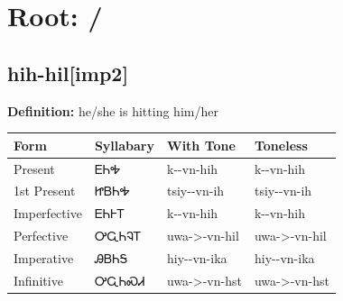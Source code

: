 \documentclass{article}%
\begin{document}
%
\normalsize%
\section*{Root:  / }%
\subsection*{hih-hil[imp2]}%
\textbf{Definition: }%
he/she is hitting him/her%
\\[0.5em]%
\begin{tabular}{|l|l|l|l|}%
\hline%
\textbf{Form}&\textbf{Syllabary}&\textbf{With Tone}&\textbf{Toneless}\\%
\hline%
Present&ᎬᏂᎭ&k{-}{-}vn{-}hih&k{-}{-}vn{-}hih\\%
1st Present&ᏥᏴᏂᎭ&tsiy{-}{-}vn{-}ih&tsiy{-}{-}vn{-}ih\\%
Imperfective&ᎬᏂᎰᎢ&k{-}{-}vn{-}hih&k{-}{-}vn{-}hih\\%
Perfective&ᎤᏩᏂᎸᎢ&uwa{-}>{-}vn{-}hil&uwa{-}>{-}vn{-}hil\\%
Imperative&ᎯᏴᏂᎦ&hiy{-}{-}vn{-}ika&hiy{-}{-}vn{-}ika\\%
Infinitive&ᎤᏩᏂᏍᏗ&uwa{-}>{-}vn{-}hst&uwa{-}>{-}vn{-}hst\\%
\hline%
\end{tabular}%
\\[1em]%
\end{document}
